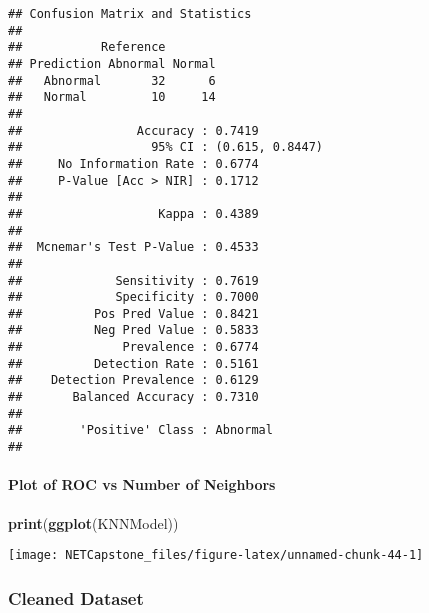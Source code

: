 \documentclass[
]{article}
\newenvironment{Shaded}{\begin{snugshade}}{\end{snugshade}}
\newcommand{\KeywordTok}[1]{\textcolor[rgb]{0.13,0.29,0.53}{\textbf{#1}}}
\newcommand{\NormalTok}[1]{#1}
\begin{document}
\begin{verbatim}
## Confusion Matrix and Statistics
## 
##           Reference
## Prediction Abnormal Normal
##   Abnormal       32      6
##   Normal         10     14
##                                          
##                Accuracy : 0.7419         
##                  95% CI : (0.615, 0.8447)
##     No Information Rate : 0.6774         
##     P-Value [Acc > NIR] : 0.1712         
##                                          
##                   Kappa : 0.4389         
##                                          
##  Mcnemar's Test P-Value : 0.4533         
##                                          
##             Sensitivity : 0.7619         
##             Specificity : 0.7000         
##          Pos Pred Value : 0.8421         
##          Neg Pred Value : 0.5833         
##              Prevalence : 0.6774         
##          Detection Rate : 0.5161         
##    Detection Prevalence : 0.6129         
##       Balanced Accuracy : 0.7310         
##                                          
##        'Positive' Class : Abnormal       
## 
\end{verbatim}

\hypertarget{plot-of-roc-vs-number-of-neighbors}{%
\paragraph{Plot of ROC vs Number of
Neighbors}\label{plot-of-roc-vs-number-of-neighbors}}

\begin{Shaded}
\begin{Highlighting}[]
\KeywordTok{print}\NormalTok{(}\KeywordTok{ggplot}\NormalTok{(KNNModel))}
\end{Highlighting}
\end{Shaded}

\begin{center}\texttt{[image: NETCapstone\_files/figure-latex/unnamed-chunk-44-1]} \end{center}

\hypertarget{cleaned-dataset-4}{%
\subsubsection{Cleaned Dataset}\label{cleaned-dataset-4}}
\end{document}

